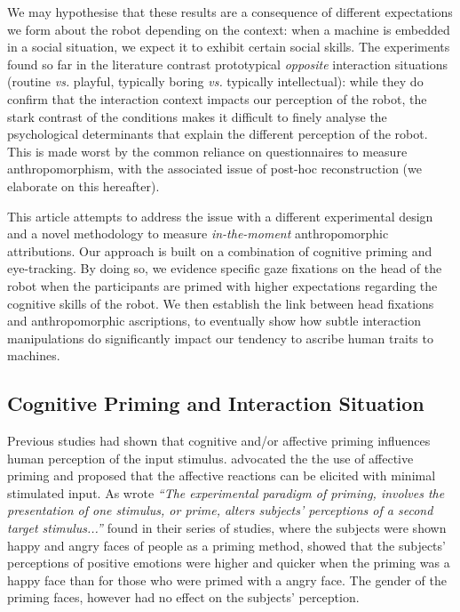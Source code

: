 \documentclass[lettersize, noapacite, twoside, HRI]{apa_HRI}
\newcommand{\vs}{\textit{vs.}\xspace}
\begin{document}
We may hypothesise that these results are a consequence of different
expectations we form about the robot depending on the context: when a machine is
embedded in a social situation, we expect it to exhibit certain
social skills. The experiments found so far in the literature contrast prototypical
\emph{opposite} interaction situations (routine \vs playful, typically boring \vs typically
intellectual): while they do confirm that the interaction context impacts our
perception of the robot, the stark contrast of the conditions makes it difficult
to finely analyse the psychological determinants that explain the different
perception of the robot. This is made worst by the common reliance on
questionnaires to measure anthropomorphism, with the associated issue of
post-hoc reconstruction (we elaborate on this hereafter).

This article attempts to address the issue with a different experimental design
and a novel methodology to measure \emph{in-the-moment} anthropomorphic
attributions.  Our approach is built on a combination of cognitive priming and
eye-tracking. By doing so, we evidence specific gaze fixations on the head
of the robot when the participants are primed with higher expectations
regarding the cognitive skills of the robot. We then establish the link
between head fixations and anthropomorphic ascriptions, to eventually show how
subtle interaction manipulations do significantly impact our tendency
to ascribe human traits to machines.



\subsection{Cognitive Priming and Interaction Situation}

Previous studies had shown that cognitive and/or affective priming influences human perception of the input stimulus. \cite{zajonc1980feeling} advocated the the use of affective priming and proposed that the affective reactions can be elicited with minimal stimulated input. As \cite{murphy1993affect} wrote \textit{``The experimental paradigm of priming, involves the presentation of one stimulus, or prime, alters subjects' perceptions of a second target stimulus...''}  \cite{murphy1993affect} found in their series of studies, where the subjects were shown happy and angry faces of people as a priming method, showed that the subjects' perceptions of positive emotions were higher and quicker when the priming was a happy face than for those who were primed with a angry face. The gender of the priming faces, however had no effect on the subjects' perception.
\end{document}
